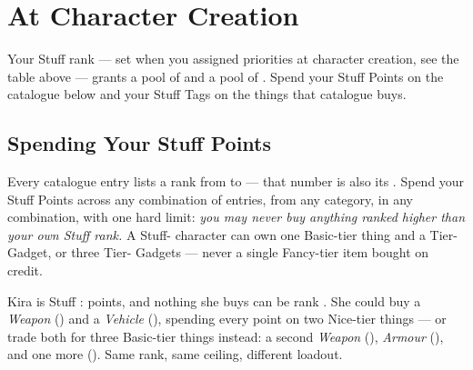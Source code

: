 \section{At Character Creation}

Your Stuff rank --- set when you assigned priorities at character
creation, see the table above --- grants a pool of  and a pool of . Spend your Stuff Points on
the catalogue below and your Stuff Tags on the things that catalogue
buys.

\subsection*{Spending Your Stuff Points}
Every catalogue entry lists a rank from  to  ---
that number is also its . Spend your Stuff Points
across any combination of entries, from any category, in any
combination, with one hard limit: \emph{you may never buy anything
ranked higher than your own Stuff rank.} A Stuff- character
can own one Basic-tier thing and a Tier- Gadget, or three
Tier- Gadgets --- never a single Fancy-tier item bought on
credit.

\begin{example}
Kira is Stuff :  points, and nothing she buys can be
rank . She could buy a \emph{Weapon} () and a
\emph{Vehicle} (), spending every point on two Nice-tier things
--- or trade both for three Basic-tier things instead: a second
\emph{Weapon} (), \emph{Armour} (), and one more
(). Same rank, same ceiling, different loadout.
\end{example}

